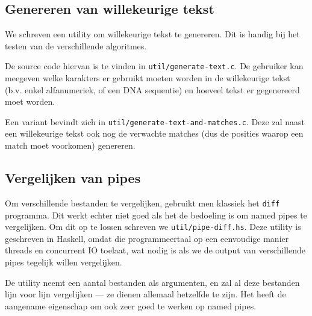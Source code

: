 \documentclass[a4paper,11pt]{article}
\begin{document}
\subsection{Genereren van willekeurige tekst}
\label{generate-text}

We schreven een utility om willekeurige tekst te genereren. Dit is handig bij
het testen van de verschillende algoritmes.

De source code hiervan is te vinden in \verb#util/generate-text.c#. De gebruiker
kan meegeven welke karakters er gebruikt moeten worden in de willekeurige tekst
(b.v. enkel alfanumeriek, of een DNA sequentie) en hoeveel tekst er gegenereerd
moet worden.

\label{generate-text-and-matches}
Een variant bevindt zich in \verb#util/generate-text-and-matches.c#. Deze zal
naast een willekeurige tekst ook nog de verwachte matches (dus de posities
waarop een match moet voorkomen) genereren.

\subsection{Vergelijken van pipes}
\label{pipe-diff}

Om verschillende bestanden te vergelijken, gebruikt men klassiek het \verb#diff#
programma. Dit werkt echter niet goed als het de bedoeling is om named pipes
te vergelijken. Om dit op te lossen schreven we \verb#util/pipe-diff.hs#. Deze
utility is geschreven in Haskell, omdat die programmeertaal op een eenvoudige
manier threads en concurrent IO toelaat, wat nodig is als we de output van
verschillende pipes tegelijk willen vergelijken.

De utility neemt een aantal bestanden als argumenten, en zal al deze bestanden
lijn voor lijn vergelijken — ze dienen allemaal hetzelfde te zijn. Het heeft de
aangename eigenschap om ook zeer goed te werken op named pipes.
\end{document}
